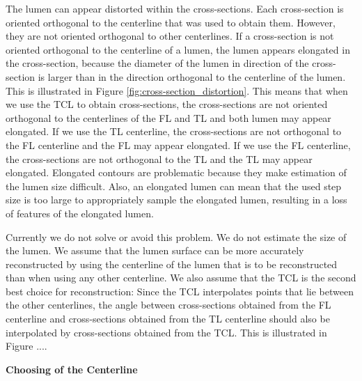 \documentclass[thesis.tex]{subfiles}
\begin{document}
The lumen can appear distorted within the cross-sections. Each cross-section is oriented orthogonal to the centerline that was used to obtain them. However, they are not oriented orthogonal to other centerlines. If a cross-section is not oriented orthogonal to the centerline of a lumen, the lumen appears elongated in the cross-section, because the diameter of the lumen in direction of the cross-section is larger than in the direction orthogonal to the centerline of the lumen. This is illustrated in Figure \ref{fig:cross-section_distortion}. This means that when we use the TCL to obtain cross-sections, the cross-sections are not oriented orthogonal to the centerlines of the FL and TL and both lumen may appear elongated. If we use the TL centerline, the cross-sections are not orthogonal to the FL centerline and the FL may appear elongated. If we use the FL centerline, the cross-sections are not orthogonal to the TL and the TL may appear elongated. Elongated contours are problematic because they make estimation of the lumen size difficult. Also, an elongated lumen can mean that the used step size is too large to appropriately sample the elongated lumen, resulting in a loss of features of the elongated lumen.

Currently we do not solve or avoid this problem. We do not estimate the size of the lumen. We assume that the lumen surface can be more accurately reconstructed by using the centerline of the lumen that is to be reconstructed than when using any other centerline. We also assume that the TCL is the second best choice for reconstruction: Since the TCL interpolates points that lie between the other centerlines, the angle between cross-sections obtained from the FL centerline and cross-sections obtained from the TL centerline should also be interpolated by cross-sections obtained from the TCL. This is illustrated in Figure .... 

\textbf{Choosing of the Centerline}
\end{document}
